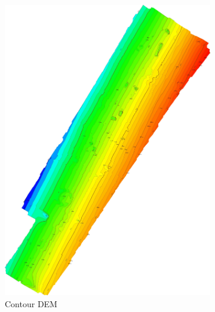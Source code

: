\documentclass{article}
\begin{document}
\begin{figure} [h]
    \centering
    \begin{subfigure} [b]{0.33\textwidth}
         \centering
         \includegraphics[scale=0.054]{ROB-15-0035_fig24a}
         \caption{Contour DEM}
         \label{fig:aaa}
    \end{subfigure}%
    \begin{subfigure} [b]{0.33\textwidth}
         \centering

\end{subfigure}
\end{figure}
\end{document}
